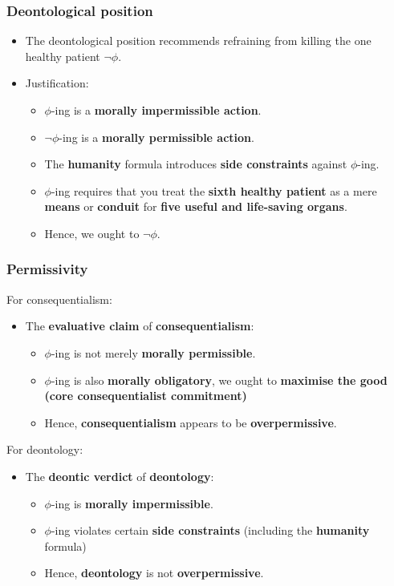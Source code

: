 \documentclass[11pt]{article}
\begin{document}
 \newpage
\subsubsection{Deontological position}
\label{sec:orgc4e183a}
\begin{itemize}
\item The deontological position recommends refraining from killing the one healthy patient \(\neg \phi\).
\item Justification:
\begin{itemize}
\item \(\phi\)-ing is a \textbf{morally impermissible action}.
\item \(\neg \phi\)-ing is a \textbf{morally permissible action}.
\item The \textbf{humanity} formula introduces \textbf{side constraints} against \(\phi\)-ing.
\item \(\phi\)-ing requires that you treat the \textbf{sixth healthy patient} as a mere \textbf{means} or \textbf{conduit} for \textbf{five useful and life-saving organs}.
\item Hence, we ought to \(\neg \phi\).
\end{itemize}
\end{itemize}
\subsubsection{Permissivity}
\label{sec:orga4caa70}
For consequentialism:
\begin{itemize}
\item The \textbf{evaluative claim} of \textbf{consequentialism}:
\begin{itemize}
\item \(\phi\)-ing is not merely \textbf{morally permissible}.
\item \(\phi\)-ing is also \textbf{morally obligatory}, we ought to \textbf{maximise the good (core consequentialist commitment)}
\item Hence, \textbf{consequentialism} appears to be \textbf{overpermissive}.
\end{itemize}
\end{itemize}

For deontology:
\begin{itemize}
\item The \textbf{deontic verdict} of \textbf{deontology}:
\begin{itemize}
\item \(\phi\)-ing is \textbf{morally impermissible}.
\item \(\phi\)-ing violates certain \textbf{side constraints} (including the \textbf{humanity} formula)
\item Hence, \textbf{deontology} is not \textbf{overpermissive}.
\end{itemize}
\end{itemize}
\end{document}
